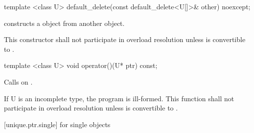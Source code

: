 \begin{itemdecl}
template <class U> default_delete(const default_delete<U[]>& other) noexcept;
\end{itemdecl}

\begin{itemdescr}
\pnum
\effects
constructs a  object from another  object.

\pnum
\remarks
This constructor shall not participate in overload resolution unless  is
convertible to .
\end{itemdescr}

%
\begin{itemdecl}
template <class U> void operator()(U* ptr) const;
\end{itemdecl}

\begin{itemdescr}
\pnum
\effects
Calls  on .

\pnum
\remarks If U is an incomplete type, the program is ill-formed.
This function shall not participate in overload resolution
unless  is convertible to .
\end{itemdescr}

[unique.ptr.single]{ for single objects}

